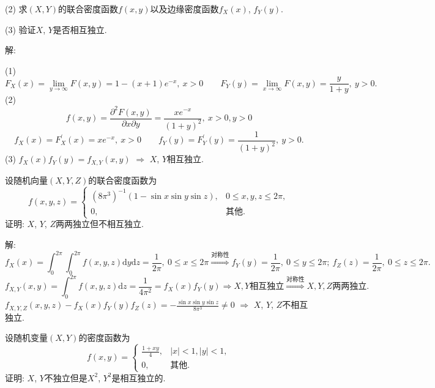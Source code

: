 \documentclass[standard]{ExBook}
\renewenvironment{shaded}{%
  \def\FrameCommand{\fboxsep=\FrameSep \colorbox{shadecolor}}%
  \MakeFramed{\advance\hsize-\width \FrameRestore}%
}{%
  \endMakeFramed
}
\begin{document}
\begin{qitems}
\begin{bbox}
\begin{shaded}
(2) 求$(X,Y)$的联合密度函数$f(x,y)$以及边缘密度函数$f_{X}(x)$, $f_{Y}(y)$.

(3) 验证$X$, $Y$是否相互独立.
    \end{shaded}
    \end{bbox}

\vspace{\dimexpr2.5cm-5em\relax}

解: 

(1)
$$F_{X}(x)=\lim\limits_{y\to\infty}F(x,y)=1-(x+1)e^{-x},\ x>0\qquad F_{Y}(y)=\lim\limits_{x\to\infty}F(x,y)=\frac{y}{1+y},\ y>0.$$
(2)
$$f(x,y)=\frac{\partial^2 F(x,y)}{\partial x\partial y}=\frac{x e^{-x}}{(1+y)^2},\ x>0,y>0$$
$$f_{X}(x)=F_{X}^{'}(x)=x e^{-x},\ x>0\qquad f_{Y}(y)=F_{Y}^{'}(y)=\frac{1}{(1+y)^2},\ y>0.$$
(3) $f_{X}(x)f_{Y}(y)=f_{X,Y}(x,y)$ $\Longrightarrow$ $X$, $Y$相互独立.

\vspace{2.5cm-5em}

    \begin{bbox}
    \begin{shaded}
        \qitem
设随机向量$(X,Y,Z)$的联合密度函数为
$$
    f(x,y,z)=
    \left\{
    \begin{array}{ll}
        (8\pi^{3})^{-1}(1-\sin x\sin y\sin z), & 0\leq x,y,z\leq2\pi,\\
        0, & \text{其他}.
    \end{array}
    \right.
$$
证明: $X$, $Y$, $Z$两两独立但不相互独立.
    \end{shaded}
    \end{bbox}

\vspace{\dimexpr2.5cm-5em\relax}

解: 
$$f_{X}(x)=\int_{0}^{2\pi}\int_{0}^{2\pi}f(x,y,z)\mathrm{d}y\mathrm{d}z=\frac{1}{2\pi},\ 0\leq x\leq 2\pi \overset{\text{对称性}}{\Longrightarrow} f_{Y}(y)=\frac{1}{2\pi},\ 0\leq y\leq 2\pi;\ f_{Z}(z)=\frac{1}{2\pi},\ 0\leq z\leq 2\pi.$$
$$f_{X,Y}(x,y)=\int_{0}^{2\pi}f(x,y,z)\mathrm{d}z=\frac{1}{4\pi^2}=f_{X}(x)f_{Y}(y) \Longrightarrow X,Y\text{相互独立} \overset{\text{对称性}}{\Longrightarrow} X,Y,Z\text{两两独立}.$$
$f_{X,Y,Z}(x,y,z) - f_{X}(x)f_{Y}(y)f_{Z}(z) = -\frac{\sin x \sin y\sin z}{8\pi^3} \neq 0$ $\Longrightarrow$ $X$, $Y$, $Z$不相互独立.

\vspace{2.5cm-5em}

    \begin{bbox}
    \begin{shaded}
        \qitem
设随机变量$(X,Y)$的密度函数为
$$
    f(x,y)=
    \left\{
    \begin{array}{ll}
        \displaystyle\frac{1+xy}{4}, &|x|<1,|y|<1,\\
        0, & \text{其他}.
    \end{array}
    \right.
$$
证明: $X$, $Y$不独立但是$X^2$, $Y^2$是相互独立的.
    \end{shaded}
    \end{bbox}


\end{qitems}
\end{document}

